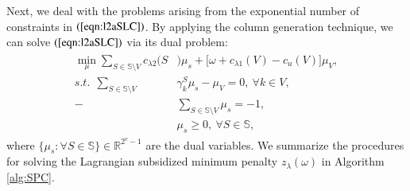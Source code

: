 \documentclass[authoryear,review,12pt]{elsarticle}
\newcommand{\R}{\mathbb{R}}
\begin{document}
Next, we deal with the problems arising from the exponential number of constraints in $(\ref{eqn:l2aSLC})$.
By applying the column generation technique, we can solve $(\ref{eqn:l2aSLC})$ via its dual problem:
\begin{eqnarray}\label{eqn:master}
\begin{aligned}
\min_{\mu} \sum_{S \in \mathbb{S} \setminus V} c_{\lambda2}(S&)\mu_s + \big[ \omega  + c_{\lambda1}(V) -c_u(V) \big]\mu_V,\\
s.t.~~\sum_{S \in \mathbb{S} \setminus V}& \gamma_k^S \mu_s - \mu_V = 0,~\forall k \in V,\\
-&\sum_{S \in \mathbb{S} \setminus V} \mu_s = -1,\\
&\mu_s \geq 0, ~\forall S \in \mathbb{S},
\end{aligned}
\end{eqnarray}
where $\{ \mu_s:\forall S \in \mathbb{S} \} \in \R^{2^v-1}$ are the dual variables.
We summarize the procedures for solving the Lagrangian subsidized minimum penalty $z_{\lambda}(\omega)$ in Algorithm \ref{alg:SPC}.
\end{document}
